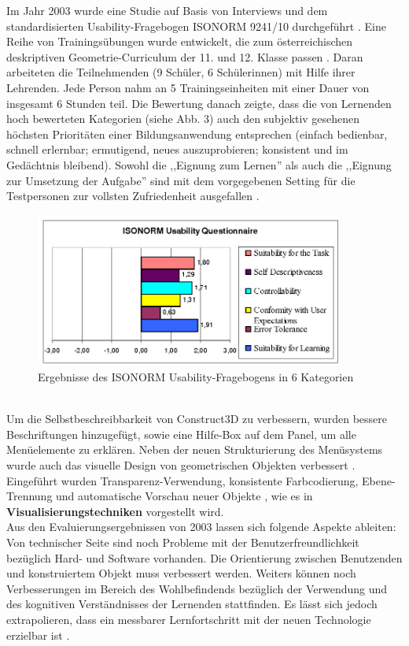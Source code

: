 \documentclass[deutsch]{llncs}
\begin{document}
 Im Jahr 2003 wurde eine Studie auf Basis von Interviews und dem standardisierten Usability-Fragebogen ISONORM 9241/10 durchgeführt \cite{Kaufmann_summaryof}. Eine Reihe von Trainingsübungen wurde entwickelt, die zum österreichischen deskriptiven Geometrie-Curriculum der 11. und 12. Klasse passen \cite{Kaufmann_summaryof}.  Daran arbeiteten die Teilnehmenden (9 Schüler, 6 Schülerinnen) mit Hilfe ihrer Lehrenden. Jede Person nahm an 5 Trainingseinheiten mit einer Dauer von insgesamt 6 Stunden teil. Die Bewertung danach zeigte, dass die von Lernenden hoch bewerteten Kategorien (siehe Abb. \label{stat1}3) auch den subjektiv gesehenen höchsten Prioritäten einer Bildungsanwendung entsprechen (einfach bedienbar, schnell erlernbar; ermutigend, neues auszuprobieren; konsistent und im Gedächtnis bleibend)\cite{Kaufmann_summaryof}. Sowohl die ,,Eignung zum Lernen'' als auch die ,,Eignung zur Umsetzung der Aufgabe'' sind mit dem vorgegebenen Setting für die Testpersonen zur vollsten Zufriedenheit ausgefallen \cite{1667626}.
\begin{figure}[t]
	\centering
	\includegraphics[width=0.9\textwidth]{figures/isonorm}
	\caption{Ergebnisse des ISONORM Usability-Fragebogens in 6 Kategorien \cite{Kaufmann_summaryof}}
	\label{fig:isonorm}
\end{figure}
\\Um die Selbstbeschreibbarkeit von Construct3D zu verbessern, wurden bessere Beschriftungen hinzugefügt, sowie eine Hilfe-Box auf dem Panel, um alle Menüelemente zu erklären. Neben der neuen Strukturierung des Menüsystems wurde auch das visuelle Design von geometrischen Objekten verbessert  \cite{Kaufmann_summaryof}.  Eingeführt wurden Transparenz-Verwendung, konsistente Farbcodierung, Ebene-Trennung und automatische Vorschau neuer Objekte \cite{Kaufmann_summaryof}, wie es in \textbf{Visualisierungstechniken} vorgestellt wird.\\
Aus den Evaluierungsergebnissen von 2003 lassen sich folgende Aspekte ableiten: Von technischer Seite sind noch Probleme mit der Benutzerfreundlichkeit bezüglich Hard- und Software vorhanden. Die Orientierung zwischen Benutzenden und konstruiertem Objekt muss verbessert werden. Weiters können noch Verbesserungen im Bereich des Wohlbefindends bezüglich der Verwendung und des kognitiven Verständnisses der Lernenden stattfinden. Es lässt sich jedoch extrapolieren, dass ein messbarer Lernfortschritt mit der neuen Technologie erzielbar ist \cite{article}. \\
\end{document}
